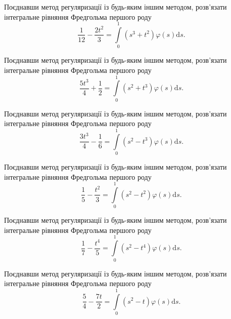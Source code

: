 \documentclass[12pt]{extarticle}
\begin{document}
\begin{Exercise}
Поєднавши метод регуляризації із будь-яким іншим методом, розв’язати інтегральне рівняння Фредгольма першого роду \[\dfrac{1}{12}-\dfrac{2t^2}{3} = \int\limits_{0}^{1} \left(s^3 + t^2\right) \varphi(s) \mathrm{d}s.\]
\end{Exercise}

\begin{Exercise}
Поєднавши метод регуляризації із будь-яким іншим методом, розв’язати інтегральне рівняння Фредгольма першого роду \[\dfrac{5t^3}{4}+\dfrac{1}{2} = \int\limits_{0}^{1} \left(s^2 + t^3\right) \varphi(s) \mathrm{d}s.\]
\end{Exercise}

\begin{Exercise}
Поєднавши метод регуляризації із будь-яким іншим методом, розв’язати інтегральне рівняння Фредгольма першого роду \[\dfrac{3t^3}{4}-\dfrac{1}{6} = \int\limits_{0}^{1} \left(s^2 - t^3\right) \varphi(s) \mathrm{d}s.\]
\end{Exercise}

\begin{Exercise}
Поєднавши метод регуляризації із будь-яким іншим методом, розв’язати інтегральне рівняння Фредгольма першого роду \[\dfrac{1}{5} - \dfrac{t^2}{3} = \int\limits_{0}^{1} \left(s^2 - t^2\right) \varphi(s) \mathrm{d}s.\]
\end{Exercise}

\begin{Exercise}
Поєднавши метод регуляризації із будь-яким іншим методом, розв’язати інтегральне рівняння Фредгольма першого роду \[\dfrac{1}{7}-\dfrac{t^4}{5} = \int\limits_{0}^{1} \left(s^2 - t^4\right) \varphi(s) \mathrm{d}s.\]
\end{Exercise}

\begin{Exercise}
Поєднавши метод регуляризації із будь-яким іншим методом, розв’язати інтегральне рівняння Фредгольма першого роду \[\dfrac{5}{4}-\dfrac{7t}{2} = \int\limits_{0}^{1} \left(s^2 - t\right) \varphi(s) \mathrm{d}s.\]
\end{Exercise}
\end{document}
